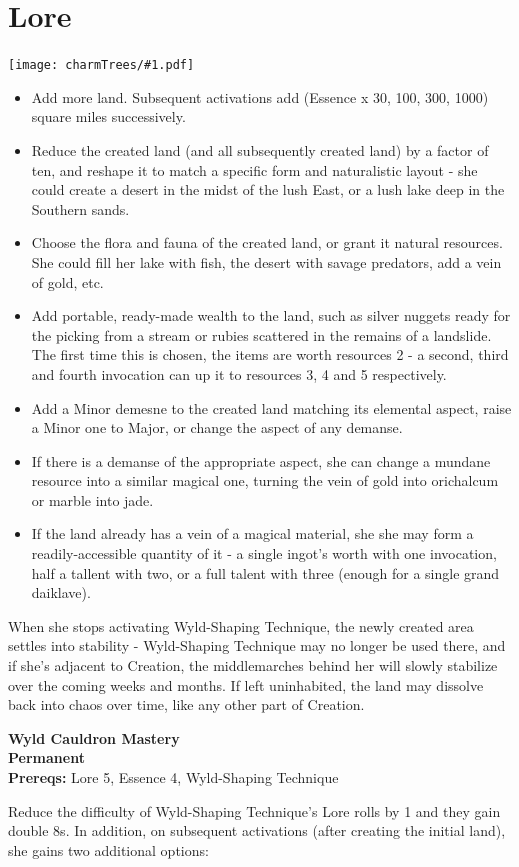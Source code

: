 \documentclass[oneside]{book}
\newcommand{\permanentCharm}[2]{
  \parbox{\linewidth}{
    \par \textbf{\color{MidnightBlue}#1} \\
    \textbf {Permanent} \\
    \textbf {Prereqs:} #2
  }
  \par
}
\newenvironment{Ability}[1]{%
  \section{#1}%
  \vspace{-0.25in}\hspace*{-0.75in}\texttt{[image: charmTrees/\#1.pdf]}%
  \begin{multicols}{2}
}
{
  \end{multicols}
}
\begin{document}
\begin{Ability}{Lore}
  \begin{itemize}
    \item Add more land. Subsequent activations add (Essence x 30, 100, 300, 1000) square miles successively.
    \item Reduce the created land (and all subsequently created land) by a factor of ten, and reshape it to match a specific form and naturalistic layout - she could create a desert in the midst of the lush East, or a lush lake deep in the Southern sands.
    \item Choose the flora and fauna of the created land, or grant it natural resources. She could fill her lake with fish, the desert with savage predators, add a vein of gold, etc.
    \item Add portable, ready-made wealth to the land, such as silver nuggets ready for the picking from a stream or rubies scattered in the remains of a landslide. The first time this is chosen, the items are worth resources 2 - a second, third and fourth invocation can up it to resources 3, 4 and 5 respectively.
    \item Add a Minor demesne to the created land matching its elemental aspect, raise a Minor one to Major, or change the aspect of any demanse.
    \item If there is a demanse of the appropriate aspect, she can change a mundane resource into a similar magical one, turning the vein of gold into orichalcum or marble into jade.
    \item If the land already has a vein of a magical material, she she may form a readily-accessible quantity of it - a single ingot's worth with one invocation, half a tallent with two, or a full talent with three (enough for a single grand daiklave).
  \end{itemize}

  When she stops activating Wyld-Shaping Technique, the newly created area settles into stability - Wyld-Shaping Technique may no longer be used there, and if she's adjacent to Creation, the middlemarches behind her will slowly stabilize over the coming weeks and months. If left uninhabited, the land may dissolve back into chaos over time, like any other part of Creation.

  \permanentCharm{Wyld Cauldron Mastery}
  {Lore 5, Essence 4, Wyld-Shaping Technique}
  Reduce the difficulty of Wyld-Shaping Technique's Lore rolls by 1 and they gain double 8s. In addition, on subsequent activations (after creating the initial land), she gains two additional options:


\end{Ability}
\end{document}
